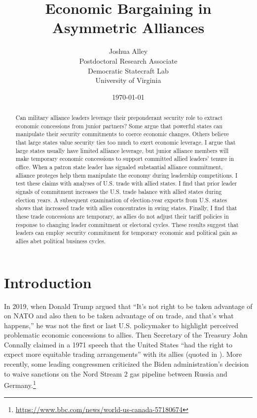 \documentclass[12pt]{article}
\title{\textbf{Economic Bargaining in Asymmetric Alliances}}
\author{
Joshua Alley\\
Postdoctoral Research Associate\\
Democratic Statecraft Lab\\
University of Virginia 
}
\date{\today}
\begin{document}
\maketitle 

\begin{abstract}
Can military alliance leaders leverage their preponderant security role to extract economic concessions from junior partners?
Some argue that powerful states can manipulate their security commitments to coerce economic changes. 
Others believe that large states value security ties too much to exert economic leverage.  
I argue that large states usually have limited alliance leverage, but junior alliance members will make temporary economic concessions to support committed allied leaders' tenure in office.
When a patron state leader has signaled substantial alliance commitment, alliance proteges help them manipulate the economy during leadership competitions.  
I test these claims with analyses of U.S. trade with allied states. 
I find that prior leader signals of commitment increases the U.S. trade balance with allied states during election years. 
A subsequent examination of election-year exports from U.S. states shows that increased trade with allies concentrates in swing states. 
Finally, I find that these trade concessions are temporary, as allies do not adjust their tariff policies in response to changing leader commitment or electoral cycles. 
These results suggest that leaders can employ security commitment for temporary economic and political gain as allies abet political business cycles. 
\end{abstract} 


\newpage 
\doublespace 


\section{Introduction}

In 2019, when Donald Trump argued that ``It's not right to be taken advantage of on NATO and also then to be taken advantage of on trade, and that's what happens,'' he was not the first or last U.S. policymaker to highlight perceived problematic economic concessions to allies.
Then Secretary of the Treasury John Connally claimed in a 1971 speech that the United States ``had the right to expect more equitable trading arrangements'' with its allies (quoted in \citet[pg 175]{Sayle2019}).
More recently, some leading congressmen criticized the Biden administration's decision to waive sanctions on the Nord Stream 2 gas pipeline between Russia and Germany.\footnote{\url{https://www.bbc.com/news/world-us-canada-57180674}}
\end{document}
